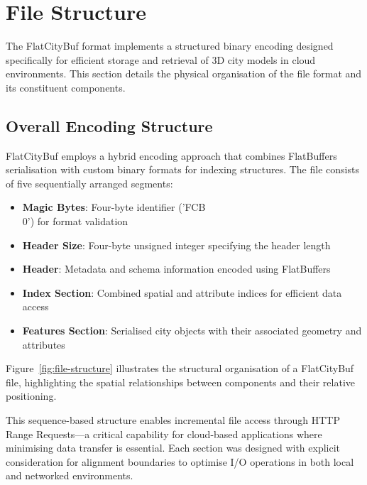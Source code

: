 \section{File Structure}
\label{methodology:file_structure}

The FlatCityBuf format implements a structured binary encoding designed specifically for efficient storage and retrieval of 3D city models in cloud environments. This section details the physical organisation of the file format and its constituent components.

\subsection{Overall Encoding Structure}
\label{methodology:overall_encoding_structure}

FlatCityBuf employs a hybrid encoding approach that combines FlatBuffers serialisation with custom binary formats for indexing structures. The file consists of five sequentially arranged segments:

\begin{itemize}
  \item \textbf{Magic Bytes}: Four-byte identifier ('FCB\\0') for format validation
  \item \textbf{Header Size}: Four-byte unsigned integer specifying the header length
  \item \textbf{Header}: Metadata and schema information encoded using FlatBuffers
  \item \textbf{Index Section}: Combined spatial and attribute indices for efficient data access
  \item \textbf{Features Section}: Serialised city objects with their associated geometry and attributes
\end{itemize}

Figure~\ref{fig:file-structure} illustrates the structural organisation of a FlatCityBuf file, highlighting the spatial relationships between components and their relative positioning.


This sequence-based structure enables incremental file access through HTTP Range Requests—a critical capability for cloud-based applications where minimising data transfer is essential. Each section was designed with explicit consideration for alignment boundaries to optimise I/O operations in both local and networked environments.


